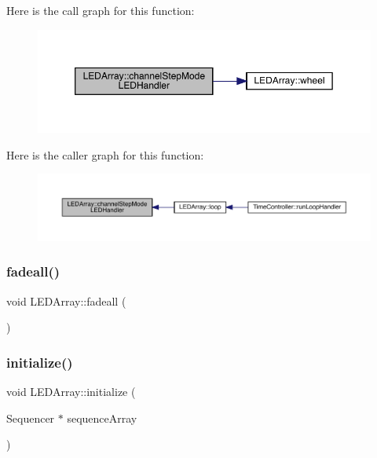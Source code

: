 Here is the call graph for this function\+:
\nopagebreak
\begin{figure}[H]
\begin{center}
\leavevmode
\includegraphics[width=350pt]{class_l_e_d_array_a81dfe62b22624f9f29d57da0298043fc_cgraph}
\end{center}
\end{figure}
Here is the caller graph for this function\+:
\nopagebreak
\begin{figure}[H]
\begin{center}
\leavevmode
\includegraphics[width=350pt]{class_l_e_d_array_a81dfe62b22624f9f29d57da0298043fc_icgraph}
\end{center}
\end{figure}
\mbox{\label{class_l_e_d_array_aa9d1531481da8b4f236a8c187f986b0d}} 
\subsubsection{\texorpdfstring{fadeall()}{fadeall()}}
{\footnotesize\ttfamily void L\+E\+D\+Array\+::fadeall (\begin{DoxyParamCaption}{ }\end{DoxyParamCaption})}

\mbox{\label{class_l_e_d_array_affcc24a132375e42e76f231da3744542}} 
\subsubsection{\texorpdfstring{initialize()}{initialize()}}
{\footnotesize\ttfamily void L\+E\+D\+Array\+::initialize (\begin{DoxyParamCaption}\item[{Sequencer $\ast$}]{sequence\+Array }\end{DoxyParamCaption})}

